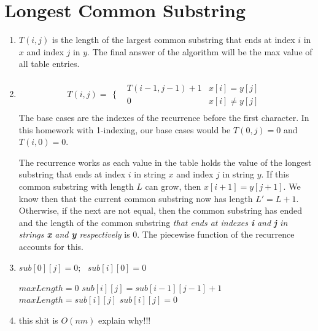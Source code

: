 \documentclass{article}
\begin{document}
\newpage
\section{Longest Common Substring}
\begin{enumerate}
    \item $T(i, j)$ is the length of the largest common substring that ends at index $i$ in $x$ and index $j$ in $y$.
            The final answer of the algorithm will be the max value of all table entries.
    \item 
        \begin{align*}
            T(i, j) = 
            \begin{array}{cc}
                \Bigg\{ & 
                \begin{array}{cc}
                    T(i-1, j-1) + 1 & x[i] = y[j] \\
                    0 & x[i] \neq y[j] 
                \end{array}
            \end{array}
        \end{align*}
        The base cases are the indexes of the recurrence before the first character. In this homework with 1-indexing, our base cases would be $T(0, j) = 0$ and $T(i, 0) = 0$.
        
        The recurrence works as each value in the table holds the value of the longest substring that ends at index $i$ in string $x$ and index $j$ in string $y$. If this common substring with length $L$ can grow,
        then $x[i+1] = y[j+1]$. We know then that the current common substring now has length $L' = L+1$. Otherwise, if the next are not equal, then the common substring has ended and the length
        of the common substring \emph{that ends at indexes \textbf{i} and \textbf{j} in strings \textbf{x} and \textbf{y} respectively} is $0$. The piecewise function of the recurrence accounts for this.
    \item 
        \begin{algorithmic}
                    \State $sub[0][j] = 0; \text{ } sub[i][0] = 0$
                \EndFor

                \State $maxLength = 0$
                            \State $sub[i][j] = sub[i-1][j-1] + 1$
                                $maxLength = sub[i][j]$
                            \EndIf
                        \Else
                            \State $sub[i][j] = 0$
                        \EndIf
                    \EndFor
                \EndFor
            \EndFunction
        \end{algorithmic}
    \item this shit is $O(nm)$ explain why!!!

\end{enumerate}
\end{document}
